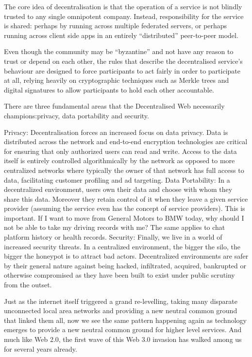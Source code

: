 \documentclass{tnreport}
\begin{document}
The core idea of decentralisation is that the operation of a service is not blindly trusted to any single omnipotent company. Instead, responsibility for the service is shared: perhaps by running across multiple federated servers, or perhaps running across client side apps in an entirely “distributed” peer-to-peer model.

Even though the community may be “byzantine” and not have any reason to trust or depend on each other, the rules that describe the decentralised service’s behaviour are designed to force participants to act fairly in order to participate at all, relying heavily on cryptographic techniques such as Merkle trees and digital signatures to allow participants to hold each other accountable.

There are three fundamental areas that the Decentralised Web necessarily champions:privacy, data portability and security.

Privacy: Decentralisation forces an increased focus on data privacy. Data is distributed across the network and end-to-end encryption technologies are critical for ensuring that only authorized users can read and write. Access to the data itself is entirely controlled algorithmically by the network as opposed to more centralized networks where typically the owner of that network has full access to data, facilitating  customer profiling and ad targeting.
Data Portability: In a decentralized environment, users own their data and choose with whom they share this data. Moreover they retain control of it when they leave a given service provider (assuming the service even has the concept of service providers). This is important. If I want to move from General Motors to BMW today, why should I not be able to take my driving records with me? The same applies to chat platform history or health records.
Security: Finally, we live in a world of increased security threats. In a centralized environment, the bigger the silo, the bigger the honeypot is to attract bad actors. Decentralized environments are safer by their general nature against being hacked, infiltrated, acquired, bankrupted or otherwise compromised as they have been built to exist under public scrutiny from the outset.


Just as the internet itself triggered a grand re-levelling, taking many disparate unconnected local area networks and providing a new neutral common ground that linked them all, now we see the same pattern happening again as technology emerges to provide a new neutral common ground for higher level services. And much like Web 2.0, the first wave of this Web 3.0 invasion has walked among us for several years already.
\end{document}
